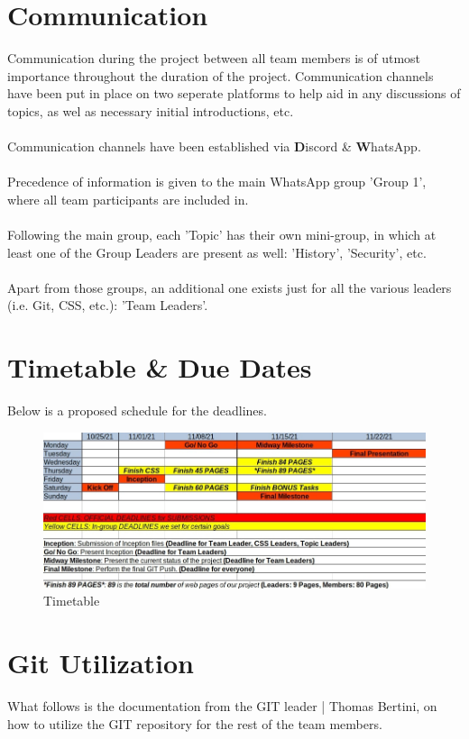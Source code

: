 \documentclass[a4paper,10pt]{article}
\begin{document}
\newpage
\section{Communication}
Communication during the project between all team members is of utmost importance throughout the duration of the project. Communication channels have been put in place on two seperate platforms to help aid in any discussions of topics, as wel as necessary initial introductions, etc.\\\\
Communication channels have been established via {\textbf Discord} \& {\textbf WhatsApp}.\\\\
Precedence of information is given to the main WhatsApp group 'Group 1', where all team participants are included in.\\\\
Following the main group, each 'Topic' has their own mini-group, in which at least one of the Group Leaders are present as well: 'History', 'Security', etc.\\\\
Apart from those groups, an additional one exists just for all the various leaders (i.e. Git, CSS, etc.): 'Team Leaders'.

\section{Timetable \& Due Dates}
Below is a proposed schedule for the deadlines. 

\begin{figure}[h!]
\includegraphics[width=0.9\linewidth, center]{thumbnail_timetable.jpg}
\caption{Timetable}
\end{figure}


\section{Git Utilization}
 What follows is the documentation from the GIT leader | Thomas Bertini, on how to utilize the GIT repository for the rest of the team members.\\
 
\end{document}
